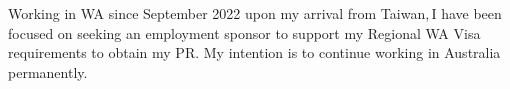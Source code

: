 

\begin{cvparagraph}

Working in WA since September 2022 upon my arrival from Taiwan,\,I have been focused on seeking an employment sponsor to support my Regional WA Visa requirements to obtain my PR. My intention is to continue working in Australia permanently.

\end{cvparagraph}

